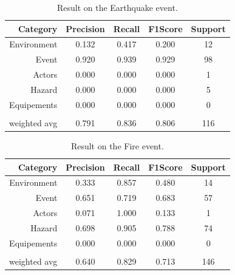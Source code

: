\begin{table}[bp]
    \centering
    \caption{Result on the Earthquake event.}
    \begin{tabular}{rcccc}
        Category     & Precision & Recall & F1\-Score & Support \\
        \toprule
        Environment  & 0.132     & 0.417  & 0.200     & 12      \\
        Event        & 0.920     & 0.939  & 0.929     & 98      \\
        Actors       & 0.000     & 0.000  & 0.000     & 1       \\
        Hazard       & 0.000     & 0.000  & 0.000     & 5       \\
        Equipements  & 0.000     & 0.000  & 0.000     & 0       \\
                     &           &        &           &         \\
        weighted avg & 0.791     & 0.836  & 0.806     & 116     \\
        \bottomrule
    \end{tabular}
    \label{table:earthquake-results}
\end{table}

\begin{table}[bp]
    \centering
    \caption{Result on the Fire event.}
    \begin{tabular}{rcccc}
        Category     & Precision & Recall & F1\-Score & Support \\
        \toprule
        Environment  & 0.333     & 0.857  & 0.480     & 14      \\
        Event        & 0.651     & 0.719  & 0.683     & 57      \\
        Actors       & 0.071     & 1.000  & 0.133     & 1       \\
        Hazard       & 0.698     & 0.905  & 0.788     & 74      \\
        Equipements  & 0.000     & 0.000  & 0.000     & 0       \\
                     &           &        &           &         \\
        weighted avg & 0.640     & 0.829  & 0.713     & 146     \\
        \bottomrule
    \end{tabular}
    \label{table:fire-results}
\end{table}

